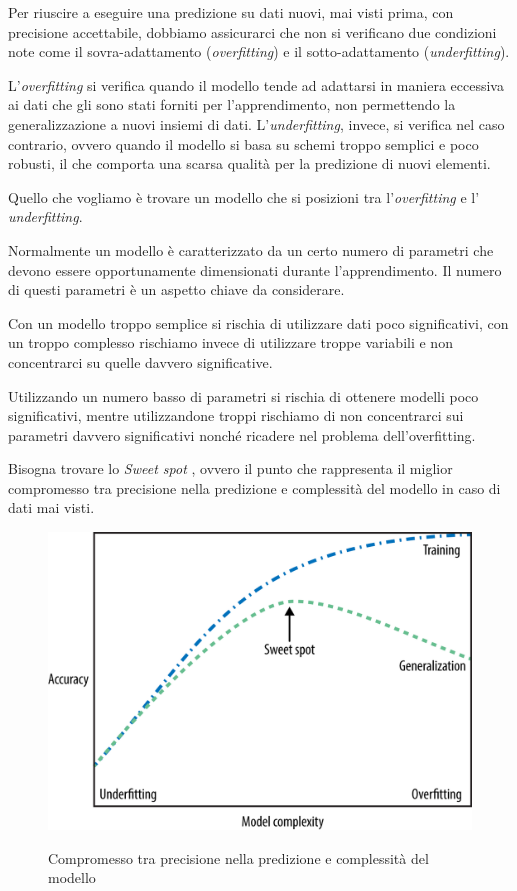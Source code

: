 \documentclass[a4paper,12pt]{report}
\begin{document}
Per riuscire a eseguire una predizione su dati nuovi, mai visti prima, con precisione accettabile, dobbiamo assicurarci che non si verificano due condizioni note come il sovra-adattamento (\textit{overfitting}) e il sotto-adattamento (\textit{underfitting}).


L’\textit{overfitting} si verifica quando il modello tende ad adattarsi in maniera eccessiva ai dati che gli sono stati forniti per l'apprendimento, non permettendo la generalizzazione a nuovi insiemi di dati. L’\textit{underfitting}, invece, si verifica nel caso contrario, ovvero quando il modello si basa su schemi troppo semplici e poco robusti, il che comporta una scarsa qualità per la predizione di nuovi elementi.

Quello che vogliamo è trovare un modello che si posizioni tra l'\textit{overfitting} e l' \textit{underfitting}.

Normalmente un modello è caratterizzato da un certo numero di parametri che devono essere opportunamente dimensionati durante l'apprendimento.
Il numero di questi parametri è un aspetto chiave da considerare.

Con un modello troppo semplice si rischia di utilizzare dati poco significativi, con un troppo complesso rischiamo invece di utilizzare troppe variabili e non concentrarci su quelle davvero significative.

Utilizzando un numero basso di parametri si rischia di ottenere modelli poco significativi, mentre utilizzandone troppi rischiamo di non concentrarci sui parametri davvero significativi nonché ricadere nel problema dell'overfitting.


Bisogna trovare lo \textit{Sweet spot} \cite{machine_learning_oreilly}, ovvero il punto che rappresenta il miglior compromesso tra precisione nella predizione e complessità del modello in caso di dati mai visti.
\begin{figure}[ht]
    \centering
    \includegraphics[scale = 0.35]{images/sweet_spot.png}
    \label{fig:sweet_spot}
    \caption{Compromesso tra precisione nella predizione e complessità del modello \cite{figure_copyright}}
\end{figure}
\end{document}
